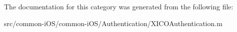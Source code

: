 The documentation for this category was generated from the following file\+:\begin{DoxyCompactItemize}
\item 
src/common-\/i\+O\+S/common-\/i\+O\+S/\+Authentication/X\+I\+C\+O\+Authentication.\+m\end{DoxyCompactItemize}
